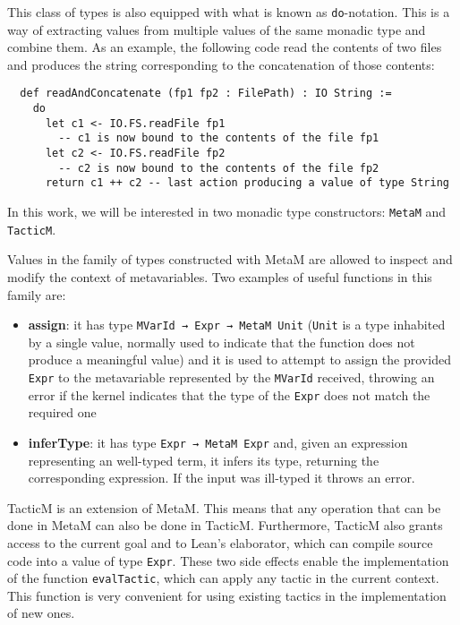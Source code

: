 This class of types is also equipped with what is known as \texttt{do}-notation. This is a way of extracting values from multiple values of the same monadic type and combine them. As an example, the following code read the contents of two files and produces the string corresponding to the concatenation of those contents:

\begin{verbatim}
  def readAndConcatenate (fp1 fp2 : FilePath) : IO String :=
    do
      let c1 <- IO.FS.readFile fp1
        -- c1 is now bound to the contents of the file fp1
      let c2 <- IO.FS.readFile fp2
        -- c2 is now bound to the contents of the file fp2
      return c1 ++ c2 -- last action producing a value of type String
\end{verbatim}

In this work, we will be interested in two monadic type constructors: \texttt{MetaM} and \texttt{TacticM}.

Values in the family of types constructed with MetaM are allowed to inspect and modify the context of metavariables. Two examples of useful functions in this family are:

\begin{itemize}
  \item \textbf{assign}: it has type \texttt{MVarId → Expr → MetaM Unit} (\texttt{Unit} is a type inhabited by a single value, normally used to indicate that the function does not produce a meaningful value) and it is used to attempt to assign the provided \texttt{Expr} to the metavariable represented by the \texttt{MVarId} received, throwing an error if the kernel indicates that the type of the \texttt{Expr} does not match the required one
  \item \textbf{inferType}: it has type \texttt{Expr → MetaM Expr} and, given an expression representing an well-typed term, it infers its type, returning the corresponding expression. If the input was ill-typed it throws an error.
\end{itemize}

TacticM is an extension of MetaM. This means that any operation that can be done in MetaM can also be done in TacticM. Furthermore, TacticM also grants access to the current goal and to Lean's elaborator, which can compile source code into a value of type \texttt{Expr}. These two side effects enable the implementation of the function \texttt{evalTactic}, which can apply any tactic in the current context. This function is very convenient for using existing tactics in the implementation of new ones.

